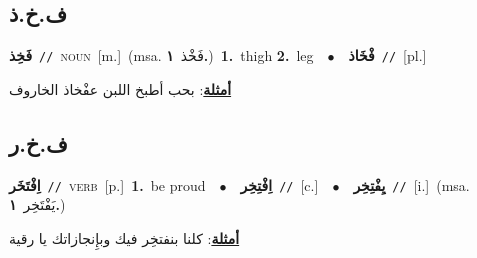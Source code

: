 \documentclass[10pt,a4paper,twoside]{article} %
\begin{document}
\begin{multicols}{2}
\vspace{-3mm}
\subsection*{\color{blue}\foreignlanguage{arabic}{ف.خ.ذ}\color{blue}{}} 

{\setlength\topsep{0pt}\textbf{\foreignlanguage{arabic}{فَخِذ}}\ {\color{gray}\texttt{//}\color{black}}\ \textsc{noun}\ [m.]\ \color{gray}(msa. \foreignlanguage{arabic}{فَخْذ}~\foreignlanguage{arabic}{\textbf{١.}})\color{black}\ \textbf{1.}~thigh  \textbf{2.}~leg\ \ $\bullet$\ \ \setlength\topsep{0pt}\textbf{\foreignlanguage{arabic}{فْخَاذ}}\ {\color{gray}\texttt{//}\color{black}}\ [pl.]\  \begin{flushright}\color{gray}\foreignlanguage{arabic}{\textbf{\underline{\foreignlanguage{arabic}{أمثلة}}}: بحب أطبخ اللبن عفْخاذ الخاروف}\end{flushright}\color{black}} \vspace{2mm}

\vspace{-3mm}
\subsection*{\color{blue}\foreignlanguage{arabic}{ف.خ.ر}\color{blue}{}} 

{\setlength\topsep{0pt}\textbf{\foreignlanguage{arabic}{اِفْتَخَر}}\ {\color{gray}\texttt{//}\color{black}}\ \textsc{verb}\ [p.]\ \textbf{1.}~be proud\ \ $\bullet$\ \ \setlength\topsep{0pt}\textbf{\foreignlanguage{arabic}{اِفْتِخِر}}\ {\color{gray}\texttt{//}\color{black}}\ [c.]\ \ $\bullet$\ \ \setlength\topsep{0pt}\textbf{\foreignlanguage{arabic}{يِفْتِخِر}}\ {\color{gray}\texttt{//}\color{black}}\ [i.]\ \color{gray}(msa. \foreignlanguage{arabic}{يَفْتَخِر}~\foreignlanguage{arabic}{\textbf{١.}})\color{black}\  \begin{flushright}\color{gray}\foreignlanguage{arabic}{\textbf{\underline{\foreignlanguage{arabic}{أمثلة}}}: كلنا بنفتخِر فيك وبإِنجازاتك يا رقية}\end{flushright}\color{black}} \vspace{2mm}


\end{multicols}
\end{document}
